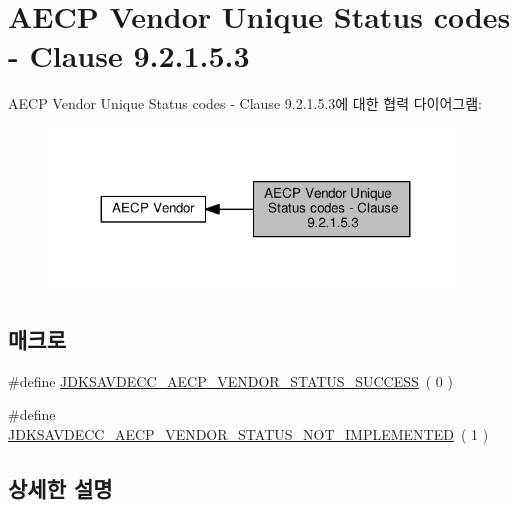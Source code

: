 \hypertarget{group__aecp__vendor__status}{}\section{A\+E\+CP Vendor Unique Status codes -\/ Clause 9.2.1.5.3}
\label{group__aecp__vendor__status}
A\+E\+CP Vendor Unique Status codes -\/ Clause 9.2.1.5.3에 대한 협력 다이어그램\+:
\nopagebreak
\begin{figure}[H]
\begin{center}
\leavevmode
\includegraphics[width=311pt]{group__aecp__vendor__status}
\end{center}
\end{figure}
\subsection*{매크로}
\begin{DoxyCompactItemize}
\item 
\#define \hyperlink{group__aecp__vendor__status_gaa4222c1275a2e15ffa8d3e395c77018c}{J\+D\+K\+S\+A\+V\+D\+E\+C\+C\+\_\+\+A\+E\+C\+P\+\_\+\+V\+E\+N\+D\+O\+R\+\_\+\+S\+T\+A\+T\+U\+S\+\_\+\+S\+U\+C\+C\+E\+SS}~( 0 )
\item 
\#define \hyperlink{group__aecp__vendor__status_ga1b0a058b6dcf991fa512999b5452674a}{J\+D\+K\+S\+A\+V\+D\+E\+C\+C\+\_\+\+A\+E\+C\+P\+\_\+\+V\+E\+N\+D\+O\+R\+\_\+\+S\+T\+A\+T\+U\+S\+\_\+\+N\+O\+T\+\_\+\+I\+M\+P\+L\+E\+M\+E\+N\+T\+ED}~( 1 )
\end{DoxyCompactItemize}


\subsection{상세한 설명}


